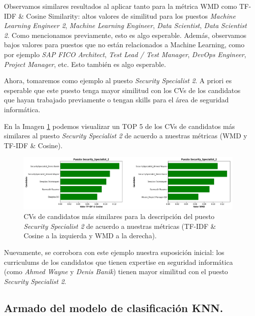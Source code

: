 \documentclass[12pt,a4paper]{article}
\begin{document}
\begin{sloppypar}
Observamos similares resultados al aplicar tanto para la métrica WMD como TF-IDF \& Cosine Similarity: altos valores de similitud para los puestos \textit{Machine Learning Engineer 2}, \textit{Machine Learning Engineer}, \textit{Data Scientist}, \textit{Data Scientist 2}. Como mencionamos previamente, esto es algo esperable. Además, observamos bajos valores para puestos que no están relacionados a Machine Learning, como por ejemplo \textit{SAP FICO Architect}, \textit{Test Lead / Test Manager}, \textit{DevOps Engineer}, \textit{Project Manager}, etc. Esto también es algo esperable.

Ahora, tomaremos como ejemplo al puesto \textit{Security Specialist 2}. A priori es esperable que este puesto tenga mayor similitud con los CVs de los candidatos que hayan trabajado previamente o tengan skills para el área de seguridad informática. 

En la Imagen \ref{fig:Valores_para_security_spec_2} podemos visualizar un TOP 5 de los CVs de candidatos más similares al puesto \textit{Security Specialist 2} de acuerdo a nuestras métricas (WMD y TF-IDF \& Cosine).

\begin{figure}[H] 
 \centering
 \includegraphics[width=1\textwidth]{images/implementacion_5/Valores_para_security_spec_2.png}
 \captionsetup{justification=centering,margin=2cm}
 \caption{CVs de candidatos más similares para la descripción del puesto \textit{Security Specialist 2} de acuerdo a nuestras métricas (TF-IDF \& Cosine a la izquierda y WMD a la derecha).} 
 \label{fig:Valores_para_security_spec_2}
\end{figure}

Nuevamente, se corrobora con este ejemplo nuestra suposición inicial: los curriculums de los candidatos que tienen expertise en seguridad informática (como \textit{Ahmed Wayne} y \textit{Denis Banik}) tienen mayor similitud con el puesto \textit{Security Specialist 2}.

\cleardoublepage

\subsection{Armado del modelo de clasificación KNN.}\label{IMP_Modelo_clasificacion_KNN}


\end{sloppypar}
\end{document}
